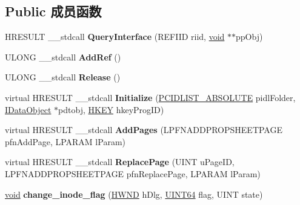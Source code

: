 \subsection*{Public 成员函数}
\begin{DoxyCompactItemize}
\item 
\mbox{\label{class_btrfs_prop_sheet_a484d7a80f5e5f93393e890a22b2a68b7}} 
H\+R\+E\+S\+U\+LT \+\_\+\+\_\+stdcall {\bfseries Query\+Interface} (R\+E\+F\+I\+ID riid, \hyperlink{interfacevoid}{void} $\ast$$\ast$pp\+Obj)
\item 
\mbox{\label{class_btrfs_prop_sheet_a6ee07239e63aabb56bc3155a57d5ffa6}} 
U\+L\+O\+NG \+\_\+\+\_\+stdcall {\bfseries Add\+Ref} ()
\item 
\mbox{\label{class_btrfs_prop_sheet_ace2a5a686a4cf56a579bf4ee1e8255fc}} 
U\+L\+O\+NG \+\_\+\+\_\+stdcall {\bfseries Release} ()
\item 
\mbox{\label{class_btrfs_prop_sheet_a7792f19a82ec9cfd727655fa58478a8e}} 
virtual H\+R\+E\+S\+U\+LT \+\_\+\+\_\+stdcall {\bfseries Initialize} (\hyperlink{struct___i_t_e_m_i_d_l_i_s_t___a_b_s_o_l_u_t_e}{P\+C\+I\+D\+L\+I\+S\+T\+\_\+\+A\+B\+S\+O\+L\+U\+TE} pidl\+Folder, \hyperlink{interface_i_data_object}{I\+Data\+Object} $\ast$pdtobj, \hyperlink{interfacevoid}{H\+K\+EY} hkey\+Prog\+ID)
\item 
\mbox{\label{class_btrfs_prop_sheet_a28695c55a8a2e863ede3f7e963e58195}} 
virtual H\+R\+E\+S\+U\+LT \+\_\+\+\_\+stdcall {\bfseries Add\+Pages} (L\+P\+F\+N\+A\+D\+D\+P\+R\+O\+P\+S\+H\+E\+E\+T\+P\+A\+GE pfn\+Add\+Page, L\+P\+A\+R\+AM l\+Param)
\item 
\mbox{\label{class_btrfs_prop_sheet_ac658793efa997d4b4be6ad71adf1f985}} 
virtual H\+R\+E\+S\+U\+LT \+\_\+\+\_\+stdcall {\bfseries Replace\+Page} (U\+I\+NT u\+Page\+ID, L\+P\+F\+N\+A\+D\+D\+P\+R\+O\+P\+S\+H\+E\+E\+T\+P\+A\+GE pfn\+Replace\+Page, L\+P\+A\+R\+AM l\+Param)
\item 
\mbox{\label{class_btrfs_prop_sheet_ab93b4585718c7e9150de989077a7e308}} 
\hyperlink{interfacevoid}{void} {\bfseries change\+\_\+inode\+\_\+flag} (\hyperlink{interfacevoid}{H\+W\+ND} h\+Dlg, \hyperlink{_processor_bind_8h_a57be03562867144161c1bfee95ca8f7c}{U\+I\+N\+T64} flag, U\+I\+NT state)
$$
\end{DoxyCompactItemize}
